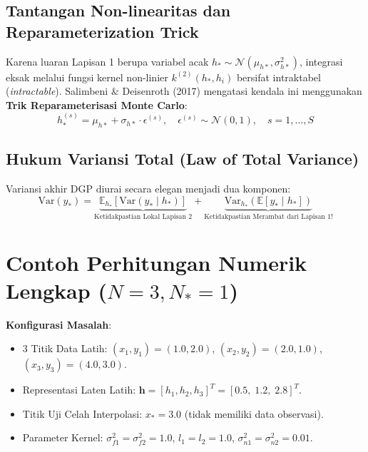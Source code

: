 \documentclass[11pt,a4paper]{article}
\begin{document}
\subsection{Tantangan Non-linearitas dan Reparameterization Trick}
\label{subsec:reparam}
Karena luaran Lapisan 1 berupa variabel acak $h_* \sim \mathcal{N}(\mu_{h*}, \sigma_{h*}^2)$, integrasi eksak melalui fungsi kernel non-linier $k^{(2)}(h_*, h_i)$ bersifat intraktabel (\textit{intractable}). Salimbeni \& Deisenroth (2017) mengatasi kendala ini menggunakan \textbf{Trik Reparameterisasi Monte Carlo}:
\begin{equation}
    h_*^{(s)} = \mu_{h*} + \sigma_{h*} \cdot \epsilon^{(s)}, \quad \epsilon^{(s)} \sim \mathcal{N}(0, 1), \quad s = 1, \dots, S
\end{equation}

\subsection{Hukum Variansi Total (Law of Total Variance)}
\label{subsec:law_total_var}
Variansi akhir DGP diurai secara elegan menjadi dua komponen:
\begin{equation}
    \mathrm{Var}(y_*) = \underbrace{\mathbb{E}_{h_*}\left[ \mathrm{Var}(y_* \mid h_*) \right]}_{\text{Ketidakpastian Lokal Lapisan 2}} + \underbrace{\mathrm{Var}_{h_*}\left( \mathbb{E}[y_* \mid h_*] \right)}_{\text{Ketidakpastian Merambat dari Lapisan 1!}}
\end{equation}

\section{Contoh Perhitungan Numerik Lengkap (\texorpdfstring{$N = 3, N_* = 1$}{N=3, N*=1})}
\label{sec:perhitungan_numerik}

\begin{mathbox}
\textbf{Konfigurasi Masalah}:
\begin{itemize}
    \item 3 Titik Data Latih: $(x_1, y_1) = (1.0, 2.0)$, $(x_2, y_2) = (2.0, 1.0)$, $(x_3, y_3) = (4.0, 3.0)$.
    \item Representasi Laten Latih: $\mathbf{h} = [h_1, h_2, h_3]^T = [0.5, \; 1.2, \; 2.8]^T$.
    \item Titik Uji Celah Interpolasi: $x_* = 3.0$ (tidak memiliki data observasi).
    \item Parameter Kernel: $\sigma_{f1}^2 = \sigma_{f2}^2 = 1.0$, $l_1 = l_2 = 1.0$, $\sigma_{n1}^2 = \sigma_{n2}^2 = 0.01$.
\end{itemize}
\end{mathbox}
\end{document}
